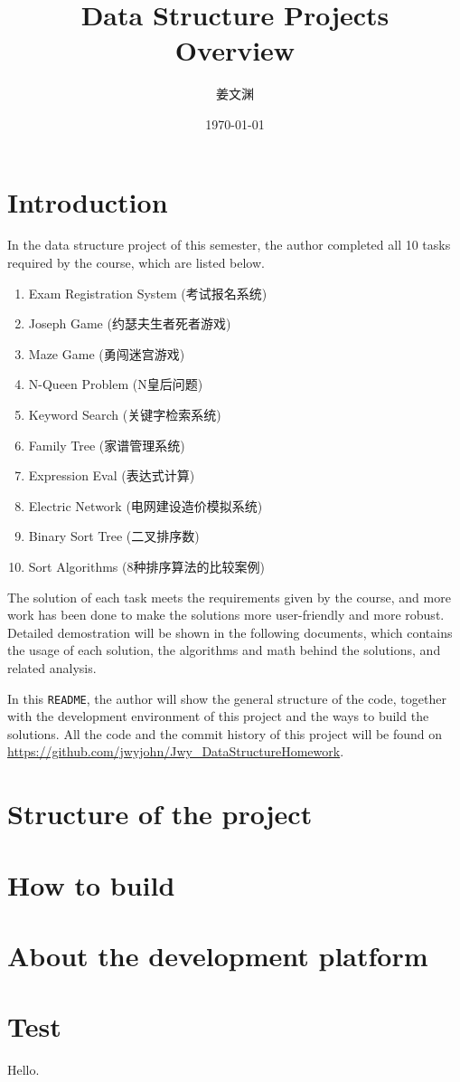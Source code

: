 \documentclass[cn,black,12pt,normal]{elegantnote}
\title{Data Structure Projects\\Overview}
\author{姜文渊}
\institute{School of Software Engineering, Tongji University}
\date{\today}
\begin{document}
\maketitle

\section{Introduction}

In the data structure project of this semester, the author completed all 10 tasks required by the course, which are listed below.

\begin{enumerate}
    \item Exam Registration System (考试报名系统)
    \item Joseph Game (约瑟夫生者死者游戏)
    \item Maze Game (勇闯迷宫游戏)
    \item N-Queen Problem (N皇后问题)
    \item Keyword Search (关键字检索系统)
    \item Family Tree (家谱管理系统)
    \item Expression Eval (表达式计算)
    \item Electric Network (电网建设造价模拟系统)
    \item Binary Sort Tree (二叉排序数)
    \item Sort Algorithms (8种排序算法的比较案例)
\end{enumerate}

The solution of each task meets the requirements given by the course, and more work has been done to make the solutions more user-friendly and more robust. Detailed demostration will be shown in the following documents, which contains the usage of each solution, the algorithms and math behind the solutions, and related analysis.

In this \lstinline{README}, the author will show the general structure of the code, together with the development environment of this project and the ways to build the solutions. All the code and the commit history of this project will be found on \url{https://github.com/jwyjohn/Jwy_DataStructureHomework}.

\section{Structure of the project}

\section{How to build}

\section{About the development platform}

\section{Test}

Hello.\cite{wiki:Selenium}


\end{document}
